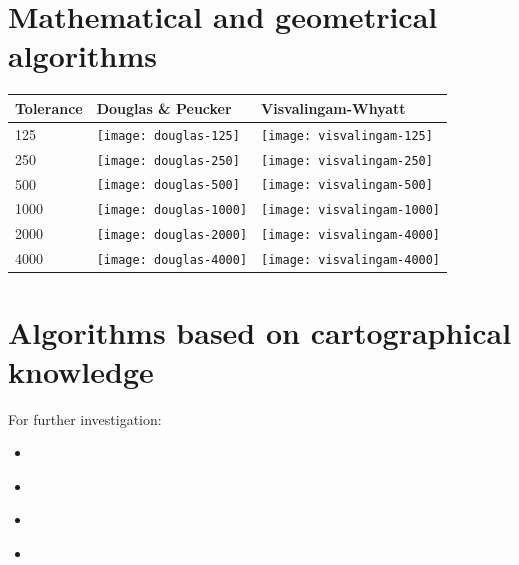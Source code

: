 \documentclass[a4paper]{article}
\begin{document}
\section{Mathematical and geometrical algorithms}


\renewcommand{\tabularxcolumn}[1]{>{\center\small}m{#1}}
\begin{tabularx}{\textwidth}{ p{1.5cm} | X | X | }
    Tolerance                                            &
    Douglas \& Peucker                                   &
    Visvalingam-Whyatt                                   \tabularnewline \hline

    125                                                  &
    \texttt{[image: douglas-125]}      &
    \texttt{[image: visvalingam-125]}  \tabularnewline \hline

    250                                                  &
    \texttt{[image: douglas-250]}      &
    \texttt{[image: visvalingam-250]}  \tabularnewline \hline

    500                                                  &
    \texttt{[image: douglas-500]}      &
    \texttt{[image: visvalingam-500]}  \tabularnewline \hline

    1000                                                 &
    \texttt{[image: douglas-1000]}     &
    \texttt{[image: visvalingam-1000]} \tabularnewline \hline

    2000                                                 &
    \texttt{[image: douglas-2000]}     &
    \texttt{[image: visvalingam-4000]} \tabularnewline \hline

    4000                                                 &
    \texttt{[image: douglas-4000]}     &
    \texttt{[image: visvalingam-4000]} \tabularnewline \hline
\end{tabularx}

\section{Algorithms based on cartographical knowledge}

For further investigation:
\begin{itemize}
    \item \cite{jiang2003line}
    \item \cite{dyken2009simultaneous}
    \item \cite{mustafa2006dynamic}
    \item \cite{nollenburg2008morphing}
\end{itemize}
\end{document}
